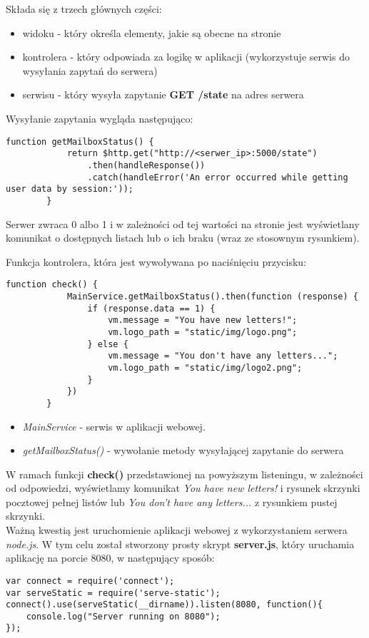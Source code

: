 Składa się z trzech głównych części:
\begin{itemize}
\item widoku - który określa elementy, jakie są obecne na stronie
\item kontrolera - który odpowiada za logikę w aplikacji (wykorzystuje serwis do wysyłania zapytań do serwera)
\item serwisu - który wysyła zapytanie \textbf{GET /state} na adres serwera
\end{itemize}

Wysyłanie zapytania wygląda następująco:
\begin{lstlisting}
function getMailboxStatus() {
            return $http.get("http://<serwer_ip>:5000/state")
                .then(handleResponse())
                .catch(handleError('An error occurred while getting user data by session:'));
        }
\end{lstlisting}

Serwer zwraca 0 albo 1 i w zależności od tej wartości na stronie jest wyświetlany komunikat o dostępnych listach lub o ich braku (wraz ze stosownym rysunkiem).

Funkcja kontrolera, która jest wywoływana po naciśnięciu przycisku:

\begin{lstlisting}
function check() {
            MainService.getMailboxStatus().then(function (response) {
                if (response.data == 1) {
                    vm.message = "You have new letters!";
                    vm.logo_path = "static/img/logo.png";
                } else {
                    vm.message = "You don't have any letters...";
                    vm.logo_path = "static/img/logo2.png";
                }
            })
        }
\end{lstlisting}

\begin{itemize}
\item \textit{MainService} -  serwis w aplikacji webowej.
\item \textit{getMailboxStatus()} - wywołanie metody wysyłającej zapytanie do serwera
\end{itemize}

W ramach funkcji \textbf{check()} przedstawionej na powyższym listeningu, w zależności od odpowiedzi, wyświetlamy komunikat \textit{You have new letters!} i rysunek skrzynki pocztowej pełnej listów lub \textit{You don't have any letters...} z rysunkiem pustej skrzynki.\\

Ważną kwestią jest uruchomienie aplikacji webowej z wykorzystaniem serwera \textit{node.js}.
W tym celu został stworzony prosty skrypt \textbf{server.js}, który uruchamia aplikację na porcie 8080, w następujący sposób:
\begin{lstlisting}
var connect = require('connect');
var serveStatic = require('serve-static');
connect().use(serveStatic(__dirname)).listen(8080, function(){
	console.log("Server running on 8080");
});
\end{lstlisting}

